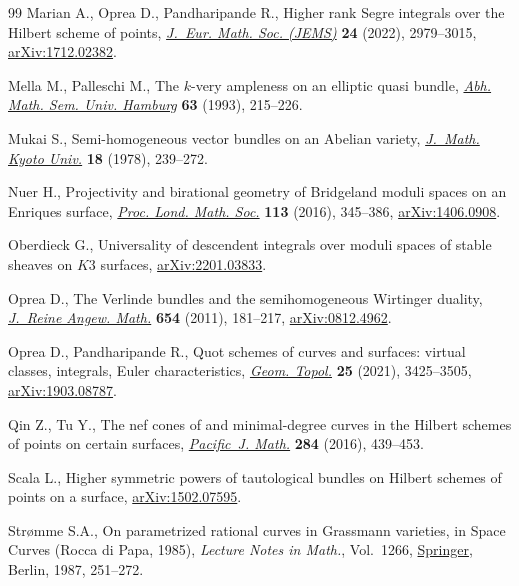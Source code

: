 \documentclass[pdftex]{sigma}
\numberwithin{equation}{section}
\begin{document}
\begin{thebibliography}{99}
Marian A., Oprea D., Pandharipande R., Higher rank {S}egre integrals over the
 {H}ilbert scheme of points, \href{https://doi.org/10.4171/jems/1149}{\textit{J.~Eur. Math. Soc. (JEMS)}} \textbf{24}
 (2022), 2979--3015, \href{https://arxiv.org/abs/1712.02382}{arXiv:1712.02382}.

Mella M., Palleschi M., The {$k$}-very ampleness on an elliptic quasi bundle,
 \href{https://doi.org/10.1007/BF02941343}{\textit{Abh. Math. Sem. Univ. Hamburg}} \textbf{63} (1993), 215--226.

Mukai S., Semi-homogeneous vector bundles on an {A}belian variety,
 \href{https://doi.org/10.1215/kjm/1250522574}{\textit{J.~Math. Kyoto Univ.}} \textbf{18} (1978), 239--272.

Nuer H., Projectivity and birational geometry of {B}ridgeland moduli spaces on
 an {E}nriques surface, \href{https://doi.org/10.1112/plms/pdw033}{\textit{Proc. Lond. Math. Soc.}} \textbf{113} (2016),
 345--386, \href{https://arxiv.org/abs/1406.0908}{arXiv:1406.0908}.

Oberdieck G., Universality of descendent integrals over moduli spaces of stable
 sheaves on $K3$ surfaces, \href{https://arxiv.org/abs/2201.03833}{arXiv:2201.03833}.

Oprea D., The {V}erlinde bundles and the semihomogeneous {W}irtinger duality,
 \href{https://doi.org/10.1515/CRELLE.2011.032}{\textit{J.~Reine Angew. Math.}} \textbf{654} (2011), 181--217,
 \href{https://arxiv.org/abs/0812.4962}{arXiv:0812.4962}.

Oprea D., Pandharipande R., Quot schemes of curves and surfaces: virtual
 classes, integrals, {E}uler characteristics, \href{https://doi.org/10.2140/gt.2021.25.3425}{\textit{Geom. Topol.}}
 \textbf{25} (2021), 3425--3505, \href{https://arxiv.org/abs/1903.08787}{arXiv:1903.08787}.

Qin Z., Tu Y., The nef cones of and minimal-degree curves in the {H}ilbert
 schemes of points on certain surfaces, \href{https://doi.org/10.2140/pjm.2016.284.439}{\textit{Pacific~J. Math.}} \textbf{284}
 (2016), 439--453.

Scala L., Higher symmetric powers of tautological bundles on {H}ilbert schemes
 of points on a surface, \href{https://arxiv.org/abs/1502.07595}{arXiv:1502.07595}.

Str{\o}mme S.A., On parametrized rational curves in {G}rassmann varieties, in
 Space Curves ({R}occa di {P}apa, 1985), \textit{Lecture Notes in Math.}, Vol.~1266, \href{https://doi.org/10.1007/BFb0078187}{Springer}, Berlin, 1987, 251--272.


\end{thebibliography}
\end{document}
